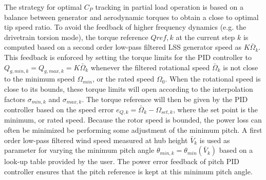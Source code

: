 The strategy for optimal $C_P$ tracking in partial load operation is based on a balance between generator and aerodynamic torques to obtain a close to optimal tip speed ratio. To avoid the feedback of higher frequency dynamics (e.g. the drivetrain torsion mode), the torque reference $Q{ref,k}$ at the current step $k$ is computed based on a second order low-pass filtered LSS generator speed as $K \bar \Omega_k$. This feedback is enforced by setting the torque limits for the PID controller to $Q_{g,min,k}=Q_{g,max,k}=K\bar \Omega_k$ whenever the filtered rotational speed $\bar \Omega_k$ is not close to the minimum speed $\Omega_{min}$, or the rated speed $\Omega_0$. When the rotational speed is close to its bounds, these torque limits will open according to the interpolation factors $\sigma_{min,k}$ and $\sigma_{max,k}$. The torque reference will then be given by the PID controller based on the speed error $e_{Q,k}=\bar\Omega_k -\Omega_{set,k}$, where the set point is the minimum, or rated speed. Because the rotor speed is bounded, the power loss can often be minimized be performing some adjustment of the minimum pitch. A first order low-pass filtered wind speed measured at hub height $\bar V_k$ is used as parameter for varying the minimum pitch angle $\theta_{min,k}=\theta_{min}(\bar V_k)$ based on a look-up table provided by the user. The power error feedback of pitch PID controller ensures that the pitch reference is kept at this minimum pitch angle.

\begin{sidewaysfigure}
\centerline{ }
\caption{Diagram of the discrete controller. Note that $k$ denotes the current time step. \label{f:diagram}}
\end{sidewaysfigure}

\begin{sidewaysfigure}
\centerline{ }
\caption{Active routes during partial load operation in the controller diagram in Figure~\ref{f:diagram}. \label{f:diagram_part}}
\end{sidewaysfigure}

\begin{sidewaysfigure}
\centerline{ }
\caption{Active routes during full load operation in the controller diagram in Figure~\ref{f:diagram}. \label{f:diagram_full}}
\end{sidewaysfigure}

